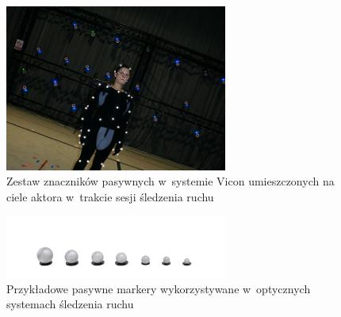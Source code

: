 \begin{savenotes}
										
	\begin{figure}[!htb]
		\centering	
		\includegraphics[width=0.65\textwidth]{images/markers-suits-600x450.png}
		\caption[Zestaw markerów pasywnych w~systemie Vicon umieszczonych na ciele aktora w~trakcie sesji śledzenia ruchu]{Zestaw znaczników pasywnych w~systemie Vicon umieszczonych na ciele aktora w~trakcie sesji śledzenia ruchu}
		\label{fig:literature:vicon:markers}
	\end{figure}
									
\end{savenotes}
		
\begin{savenotes}
										
	\begin{figure}[!htb]
		\centering	
		\includegraphics[width=0.65\textwidth]{images/super-spherical-markers-hero.jpg}
		\caption[Przykładowe pasywne markery wykorzystywane w~optycznych systemach śledzenia ruchu]{Przykładowe pasywne markery wykorzystywane w~optycznych systemach śledzenia ruchu}		
		\label{fig:literature:qualisys:markers}
	\end{figure}
									
\end{savenotes}
			
